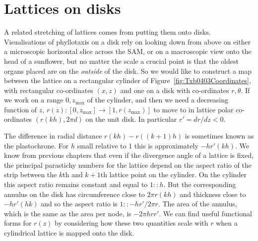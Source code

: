 \section{Lattices on disks}
A related stretching of lattices comes from putting them onto disks. 
Visualisations of phyllotaxis on a disk rely on looking down from above on either a microscopic horizontal slice across the SAM, or on a macroscopic view  onto the head of a sunflower, but no matter the scale a crucial point is that the oldest organs placed are on the \textit{outside} of the disk. 
So we would like to construct a map between the lattice on a rectangular cylinder of Figure~\ref{fig:Txb0403Coordinates}, with rectangular co-ordinates $(x,z)$ and one on a disk with co-ordinates $r,\theta$. If we work on a  range $0,z_{\text{max}}$ of the cylinder, and then we need a decreasing function of $z$, $r(z):[ 0,z_{\text{max}}]\rightarrow[ 1, r(z_{\text{max}})]$ to move to in lattice polar co-ordinates $(r(k h),2\pi d)$ on the unit disk. In particular $r'=dr/dz<0$. 

	
The difference in radial distance $r(kh)-r((k+1)h)$ is sometimes known as the plastochrone. For $h$ small relative to 1 this is approximately $-hr'(kh)$.  We know from previous chapters that even if the divergence angle of a lattice is fixed, the principal parastichy numbers for the lattice depend on the aspect ratio of the strip between the $k$th and $k+1$th lattice point on the cylinder. On the cylinder this aspect ratio remains constant and equal to $1::h$. But the corresponding annulus on the disk has circumference close to $2\pi r(kh)$ and thickness close to $-hr'(hk)$ and so the aspect ratio is $1::-hr'/2\pi r$. The area of the annulus, which is the same as the area per node, is $-2\pi h  r r'$. 
We can find useful functional forms for $r(z)$ by considering how these two quantities scale with $r$ when a cylindrical lattice is mapped onto the disk.
